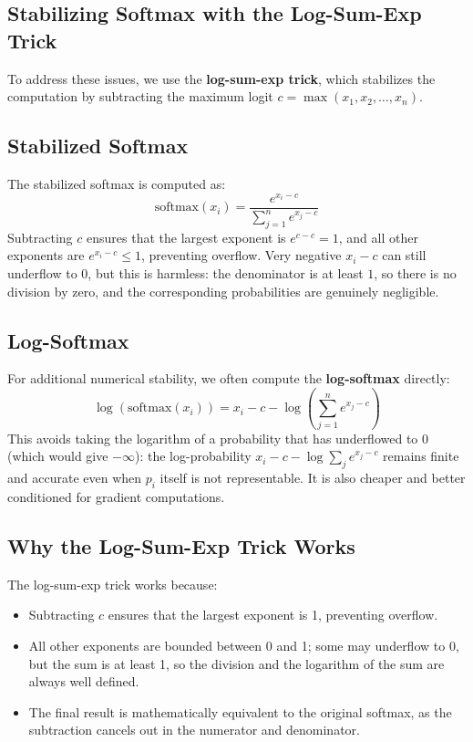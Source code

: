 \begin{notechapter}
\section{Stabilizing Softmax with the Log-Sum-Exp Trick}
To address these issues, we use the \textbf{log-sum-exp trick}, which 
stabilizes the computation by subtracting the maximum logit \( c = \max(x_1, x_2, \dots, x_n) \).

\subsection{Stabilized Softmax}
The stabilized softmax is computed as:
\[
\text{softmax}(x_i) = \frac{e^{x_i - c}}{\sum_{j=1}^n e^{x_j - c}}
\]
Subtracting \( c \) ensures that the largest exponent is \( e^{c - c} = 1 \), 
and all other exponents are \( e^{x_i - c} \leq 1 \), preventing overflow.
Very negative \( x_i - c \) can still underflow to \( 0 \), but this is harmless:
the denominator is at least \( 1 \), so there is no division by zero, and the
corresponding probabilities are genuinely negligible.

\subsection{Log-Softmax}
For additional numerical stability, we often compute the \textbf{log-softmax} 
directly:
\[
\log(\text{softmax}(x_i)) = x_i - c - \log\left(\sum_{j=1}^n e^{x_j - c}\right)
\]
This avoids taking the logarithm of a probability that has underflowed to
\( 0 \) (which would give \( -\infty \)): the log-probability \( x_i - c - \log\sum_j e^{x_j - c} \)
remains finite and accurate even when \( p_i \) itself is not representable. It is
also cheaper and better conditioned for gradient computations.

\subsection{Why the Log-Sum-Exp Trick Works}
The log-sum-exp trick works because:
\begin{itemize}
    \item Subtracting \( c \) ensures that the largest exponent is 1, 
    preventing overflow.
        \item All other exponents are bounded between 0 and 1; some may
    underflow to 0, but the sum is at least 1, so the division and the
    logarithm of the sum are always well defined.
    \item The final result is mathematically equivalent to the original 
    softmax, as the subtraction cancels out in the numerator and denominator.
\end{itemize}


\end{notechapter}
